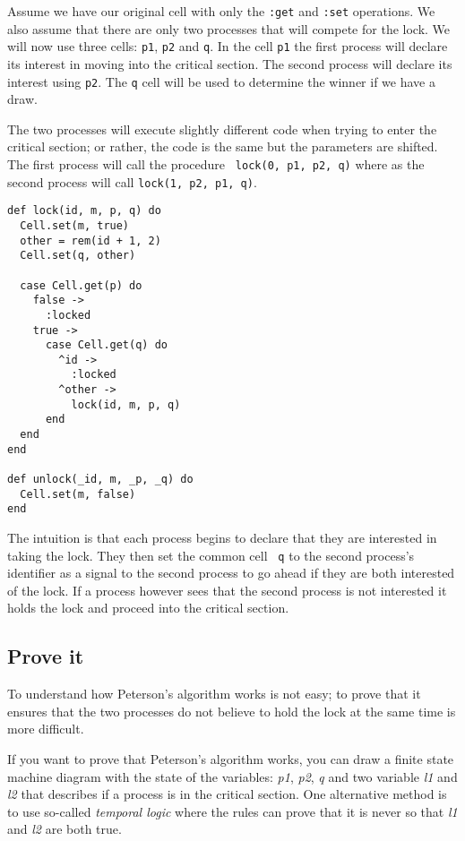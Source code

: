 \documentclass[a4paper,11pt]{article}
\begin{document}
Assume we have our original cell with only the {\tt :get} and {\tt :set}
operations. We also assume that there are only two processes that will
compete for the lock. We will now use three cells: {\tt p1}, {\tt p2}
and {\tt q}. In the cell {\tt p1} the first process will declare its
interest in moving into the critical section. The second process will
declare its interest using {\tt p2}. The {\tt q} cell will be used to
determine the winner if we have a draw.

The two processes will execute slightly different code when trying to
enter the critical section; or rather, the code is the same but the
parameters are shifted. The first process will call the procedure {\tt
  lock(0, p1, p2, q)} where as the second process will call {\tt lock(1, p2, p1, q)}.

\pagebreak

\begin{verbatim}
def lock(id, m, p, q) do
  Cell.set(m, true)
  other = rem(id + 1, 2)
  Cell.set(q, other)

  case Cell.get(p) do
    false ->
      :locked
    true ->
      case Cell.get(q) do
        ^id ->
          :locked
        ^other ->
          lock(id, m, p, q)
      end
  end
end

def unlock(_id, m, _p, _q) do
  Cell.set(m, false)
end
\end{verbatim}

The intuition is that each process begins to declare that they are
interested in taking the lock. They then set the common cell {\tt
  q} to the second process's identifier as a signal to the second
process to go ahead if they are both interested of the lock. If a
process however sees that the second process is not interested it
holds the lock and proceed into the critical section.


\subsection{Prove it}

To understand how Peterson's algorithm works is not easy; to prove
that it ensures that the two processes do not believe to hold the
lock at the same time is more difficult. 
  
If you want to prove that Peterson's algorithm works, you can draw a
finite state machine diagram with the state of the variables: {\em
  p1}, {\em p2}, {\em q} and two variable {\em l1} and {\em l2} that
describes if a process is in the critical section. One alternative
method is to use so-called {\em temporal logic} where the rules can
prove that it is never so that {\em l1} and {\em l2} are both true.
\end{document}
